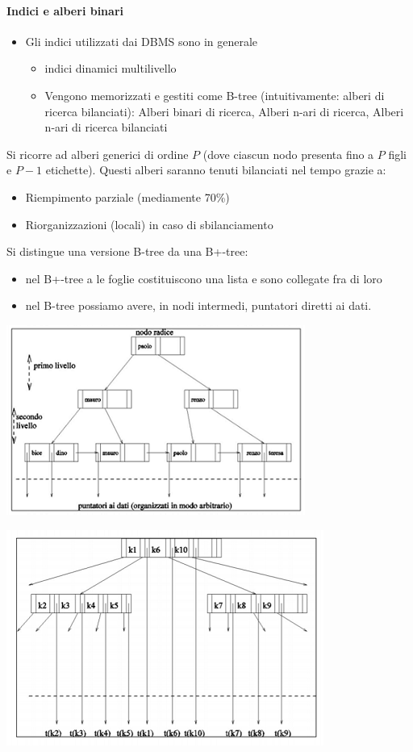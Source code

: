 \paragraph{Indici e alberi binari}
\begin{itemize}
	\item Gli indici utilizzati dai DBMS sono in generale
	\begin{itemize}
		\item indici dinamici multilivello 
		\item Vengono memorizzati e gestiti come B-tree (intuitivamente: alberi di ricerca bilanciati): Alberi binari di ricerca, Alberi n-ari di ricerca, Alberi n-ari di ricerca bilanciati
	\end{itemize}
\end{itemize}
Si ricorre ad alberi generici di ordine $P$ (dove ciascun nodo presenta fino a $P$ figli e $P-1$ etichette). Questi alberi saranno tenuti bilanciati nel tempo grazie a:
\begin{itemize}
	\item Riempimento parziale (mediamente 70\%) 
	\item Riorganizzazioni (locali) in caso di sbilanciamento
\end{itemize}
Si distingue una versione B-tree da una B+-tree: 
\begin{itemize}
	\item nel B+-tree a le foglie costituiscono una lista e sono collegate fra di loro
	\item nel B-tree possiamo avere, in nodi intermedi, puntatori diretti ai dati. 
\end{itemize}
\begin{multicols}{2}
	\begin{center}\includegraphics{images/181.PNG}\end{center}
	\begin{center}\includegraphics{images/182.PNG}\end{center}
\end{multicols}
